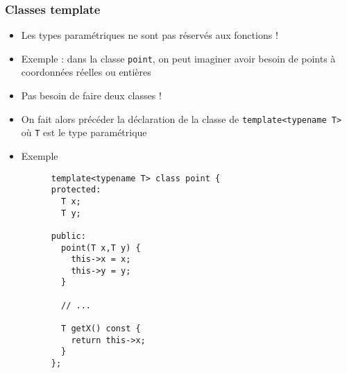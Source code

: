 \begin{frame}[fragile]\frametitle{Classes template}
  \begin{itemize}
    \item Les types paramétriques ne sont pas réservés aux fonctions !
    \item Exemple : dans la classe \texttt{point}, on peut imaginer avoir besoin de points à coordonnées réelles ou entières
    \item Pas besoin de faire deux classes !
    \item On fait alors précéder la déclaration de la classe de \texttt{template<typename T>} où \texttt{T} est le type paramétrique
    \item Exemple
    \begin{lstlisting}
      template<typename T> class point {
      protected:
        T x;
        T y;

      public:
        point(T x,T y) {
          this->x = x;
          this->y = y;
        }

        // ...

        T getX() const {
          return this->x;
        }
      };
    \end{lstlisting}
  \end{itemize}
\end{frame}


